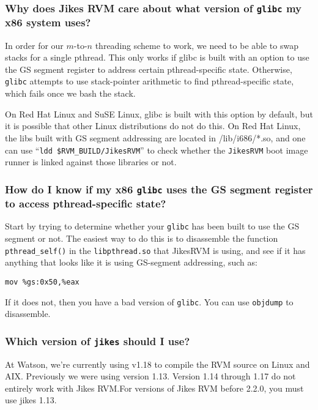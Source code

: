 \subsubsection{Why does Jikes RVM care about what version of \texttt{glibc} my x86 system uses?}

In
order for our $m$-to-$n$ threading scheme to work, we need to be able to swap
stacks for a single pthread.  This only works if glibc is built with an
option to use the GS segment register to address certain pthread-specific
state.  Otherwise, \texttt{glibc} attempts to use stack-pointer
arithmetic to find pthread-specific state, which fails once we bash the stack.

On Red Hat\TMweb{} Linux and SuSE\Rweb{} Linux, glibc is built with this option by
default, but it is possible that other Linux distributions do not do
this.  On Red Hat Linux, the libs built with GS segment addressing are
located in /lib/i686/*.so, and one can use ``\texttt{ldd
  \$RVM\_BUILD/JikesRVM}'' to check whether the \texttt{JikesRVM} boot
image runner is linked against those libraries or not.

\subsubsection{How do I know if my x86 \texttt{glibc} uses the GS
  segment register to access pthread-specific state?}

Start by trying to determine whether your \texttt{glibc} has been
built to use the GS segment 
or not.  The easiest way to do this is to disassemble the function
\texttt{pthread\_self()} in the \texttt{libpthread.so} that JikesRVM is using, and see if it has
anything that looks like it is using GS-segment addressing, such as:
\begin{verbatim}
mov %gs:0x50,%eax
\end{verbatim}
If it does not, then you have a bad version of \texttt{glibc}.   You
can use \texttt{objdump} to disassemble.


\subsubsection{Which version of {\tt jikes} should I use?}
At Watson, we're currently using  v1.18
to compile the RVM source on Linux\Rweb{} and AIX\TMweb. Previously we
were using version 1.13. Version 1.14 through 1.17 do not entirely
work with Jikes RVM.\@  For versions of Jikes RVM before 2.2.0, you must
use jikes 1.13.

